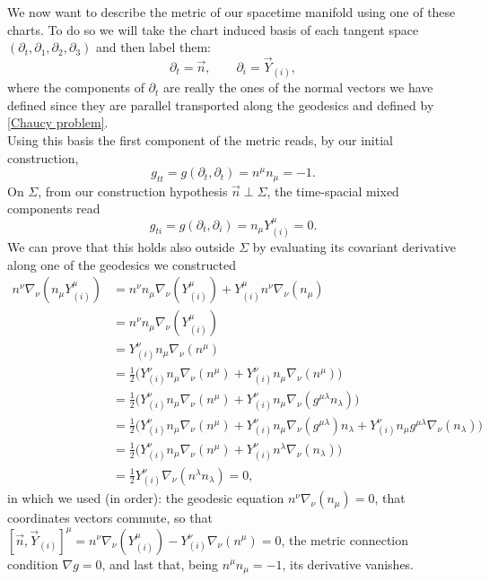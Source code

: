 We now want to describe the metric of our spacetime manifold using one of these charts. To do so we will take the chart induced basis of each tangent space $(\partial_t,\partial_1,\partial_2,\partial_3)$ and then label them:
\begin{equation}
    \partial_t=\vec n,\qquad \partial_i= \vec Y_{(i)},
\end{equation}
where the components of $\partial_t$ are really the ones of the normal vectors we have defined since they are parallel transported along the geodesics and defined by \ref{Chaucy problem}.\\
Using this basis the first component of the metric reads, by our initial construction,
\begin{equation}
    g_{tt}=g(\partial_t,\partial_t)=n^\mu n_\mu=-1.\label{gen gtt}
\end{equation} 
On $\Sigma$, from our construction hypothesis $\vec{n}\perp\Sigma $, the time-spacial mixed components read 
\begin{equation}
    g_{ti}=g(\partial_t,\partial_i)=n_\mu Y^\mu_{(i)}=0.\label{gen gti}
\end{equation} 
We can prove that this holds also outside $\Sigma$ by evaluating its covariant derivative along one of the geodesics we constructed
\begin{align*}
    n^\nu\nabla_\nu(n_\mu Y_{(i)}^\mu)&=n^\nu n_\mu \nabla_\nu( Y_{(i)}^\mu)+Y_{(i)}^\mu n^\nu  \nabla_\nu(n_\mu )\\
    &=n^\nu n_\mu \nabla_\nu( Y_{(i)}^\mu)\\
    &=Y^\nu_{(i)}n_\mu\nabla_\nu(n^\mu)\\
    &=\frac{1}{2}\big(Y^\nu_{(i)}n_\mu\nabla_\nu(n^\mu)+Y^\nu_{(i)}n_\mu\nabla_\nu(n^\mu)\big)\\
    &=\frac{1}{2}\big(Y^\nu_{(i)}n_\mu\nabla_\nu(n^\mu)+Y^\nu_{(i)}n_\mu\nabla_\nu(g^{\mu\lambda}n_{\lambda})\big)\\
    &=\frac{1}{2}\big(Y^\nu_{(i)}n_\mu\nabla_\nu(n^\mu)+Y^\nu_{(i)}n_\mu\nabla_\nu(g^{\mu\lambda})n_{\lambda}+Y^\nu_{(i)}n_\mu g^{\mu\lambda}\nabla_\nu(n_{\lambda})\big)\\
    &=\frac{1}{2}\big(Y^\nu_{(i)}n_\mu\nabla_\nu(n^\mu)+Y^\nu_{(i)}n^\lambda\nabla_\nu(n_{\lambda})\big)\\
    &=\frac{1}{2}Y^\nu_{(i)}\nabla_\nu(n^\lambda n_\lambda)=0,
\end{align*}
in which we used (in order): the geodesic equation $n^\nu  \nabla_\nu(n_\mu )=0$, that coordinates vectors commute, so that $[\vec n,\vec Y_{(i)}]^\mu=n^\nu \nabla_\nu( Y_{(i)}^\mu)-Y^\nu_{(i)}\nabla_\nu(n^\mu)=0$, the metric connection condition $\nabla g=0$, and last that, being $n^\mu n_\mu=-1$, its derivative vanishes.\\
